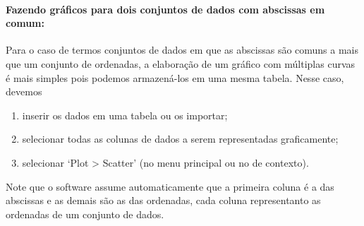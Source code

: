 \paragraph{Fazendo gráficos para dois conjuntos de dados com abscissas em comum:}

Para o caso de termos conjuntos de dados em que as abscissas são comuns a mais que um conjunto de ordenadas, a elaboração de um gráfico com múltiplas curvas é mais simples pois podemos armazená-los em uma mesma tabela. Nesse caso, devemos
\begin{enumerate}
	\item inserir os dados em uma tabela ou os importar;
	\item selecionar todas as colunas de dados a serem representadas graficamente; 
	\item selecionar `\textsf{Plot > Scatter}' (no menu principal ou no de contexto).
\end{enumerate}
%
Note que o software assume automaticamente que a primeira coluna é a das abscissas e as demais são as das ordenadas, cada coluna representanto as ordenadas de um conjunto de dados.






